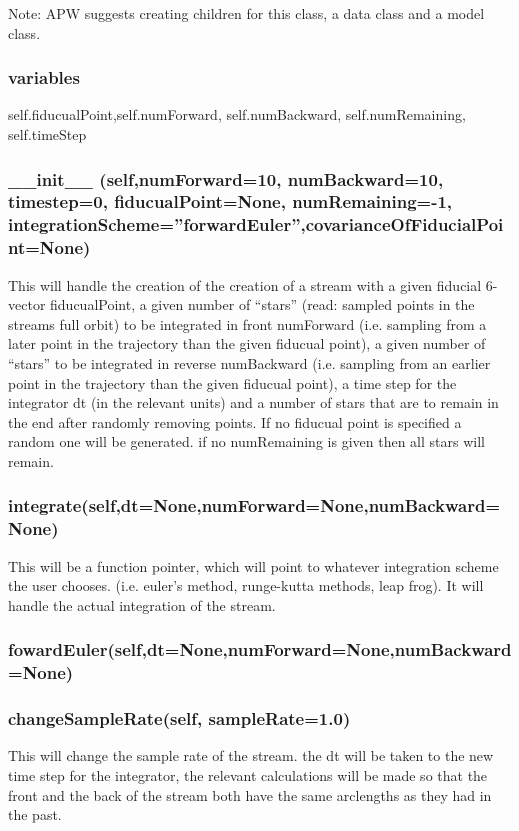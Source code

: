 \documentclass{article}
\begin{document}
Note: APW suggests creating children for this class, a data class and a model class. 

\subsubsection{variables}
self.fiducualPoint,self.numForward, self.numBackward, self.numRemaining, self.timeStep
\subsubsection{ \_\_init\_\_ (self,numForward=10, numBackward=10, timestep=0, fiducualPoint=None, numRemaining=-1, integrationScheme=''forwardEuler'',covarianceOfFiducialPoint=None) }
This will handle the creation of the creation of a stream with a given fiducial 6-vector fiducualPoint, a given number 
of ``stars'' (read: sampled points in the streams full orbit) to be integrated in front numForward (i.e. sampling 
from a later point in the trajectory than the given fiducual point), a given number of ``stars'' to be
 integrated in reverse numBackward (i.e. sampling from an earlier point in the trajectory than the given fiducual point), a time step for the integrator 
dt (in the relevant units) and a number of stars that are to remain in the end after randomly removing points. If no fiducual point 
is specified a random one will be generated. if no numRemaining is given then all stars will remain.

\subsubsection{integrate(self,dt=None,numForward=None,numBackward=None)}
This will be a function pointer, which will point to whatever integration scheme the user chooses. 
(i.e. euler's method, runge-kutta methods, leap frog). It will handle the actual integration of the stream.
\subsubsection{fowardEuler(self,dt=None,numForward=None,numBackward=None)}
\subsubsection{changeSampleRate(self, sampleRate=1.0)}
This will change the sample rate of the stream. the dt will be taken to the new time step for the integrator, the relevant calculations will be made so that
the front and the back of the stream both have the same arclengths as they had in the past. 
\end{document}
